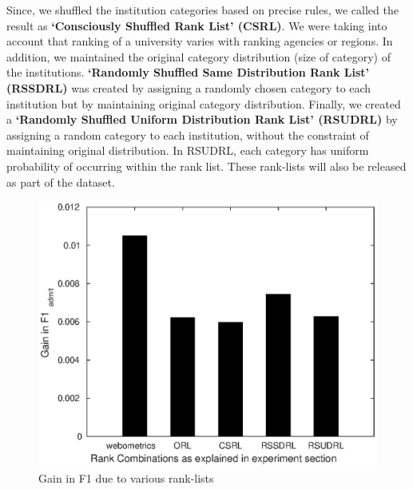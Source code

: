 \documentclass{sig-alternate-05-2015}
\begin{document}
Since, we shuffled the institution categories based on precise rules, we called the result as \textbf{`Consciously Shuffled Rank List' (CSRL)}. We were taking into account that ranking of a university varies with ranking agencies or regions. In addition, we maintained the original category distribution (size of category) of the institutions. \textbf{`Randomly Shuffled Same Distribution Rank List' (RSSDRL)} was created by assigning a randomly chosen category to each institution but by maintaining original category distribution. Finally, we created a \textbf{`Randomly Shuffled Uniform Distribution Rank List' (RSUDRL)} by assigning a random category to each institution, without the constraint of maintaining original distribution. In RSUDRL, each category has uniform probability of occurring within the rank list. These rank-lists will also be released as part of the dataset.

\begin{figure}[t]
\centering
\includegraphics[scale=0.6]{undergrad_rank_gain.eps}
\caption{Gain in F1 due to various rank-lists}
\label{fig:undergrad_rank_gain}
\end{figure}
\end{document}
